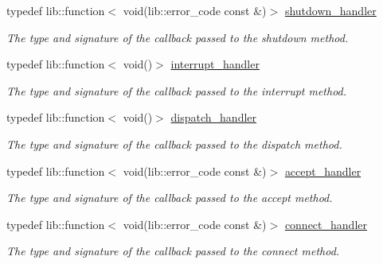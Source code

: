 \begin{DoxyCompactItemize}
\mbox{\label{namespacewebsocketpp_1_1transport_af39aff6fc4cb76f7df0d5322b734d156}} 
typedef lib\+::function$<$ void(lib\+::error\+\_\+code const \&)$>$ \mbox{\hyperlink{namespacewebsocketpp_1_1transport_af39aff6fc4cb76f7df0d5322b734d156}{shutdown\+\_\+handler}}
\begin{DoxyCompactList}\small\item\em The type and signature of the callback passed to the shutdown method. \end{DoxyCompactList}\item 
\mbox{\label{namespacewebsocketpp_1_1transport_a8090563b066d7e8e31f7165be18dee51}} 
typedef lib\+::function$<$ void()$>$ \mbox{\hyperlink{namespacewebsocketpp_1_1transport_a8090563b066d7e8e31f7165be18dee51}{interrupt\+\_\+handler}}
\begin{DoxyCompactList}\small\item\em The type and signature of the callback passed to the interrupt method. \end{DoxyCompactList}\item 
\mbox{\label{namespacewebsocketpp_1_1transport_a6658447b2e10f4c712dd792aad0e0c78}} 
typedef lib\+::function$<$ void()$>$ \mbox{\hyperlink{namespacewebsocketpp_1_1transport_a6658447b2e10f4c712dd792aad0e0c78}{dispatch\+\_\+handler}}
\begin{DoxyCompactList}\small\item\em The type and signature of the callback passed to the dispatch method. \end{DoxyCompactList}\item 
\mbox{\label{namespacewebsocketpp_1_1transport_a9326ea831379368ee47841b2e46cb009}} 
typedef lib\+::function$<$ void(lib\+::error\+\_\+code const \&)$>$ \mbox{\hyperlink{namespacewebsocketpp_1_1transport_a9326ea831379368ee47841b2e46cb009}{accept\+\_\+handler}}
\begin{DoxyCompactList}\small\item\em The type and signature of the callback passed to the accept method. \end{DoxyCompactList}\item 
\mbox{\label{namespacewebsocketpp_1_1transport_ac392fca34e946b48414278c0c3addfa5}} 
typedef lib\+::function$<$ void(lib\+::error\+\_\+code const \&)$>$ \mbox{\hyperlink{namespacewebsocketpp_1_1transport_ac392fca34e946b48414278c0c3addfa5}{connect\+\_\+handler}}
\begin{DoxyCompactList}\small\item\em The type and signature of the callback passed to the connect method. \end{DoxyCompactList}\end{DoxyCompactItemize}


